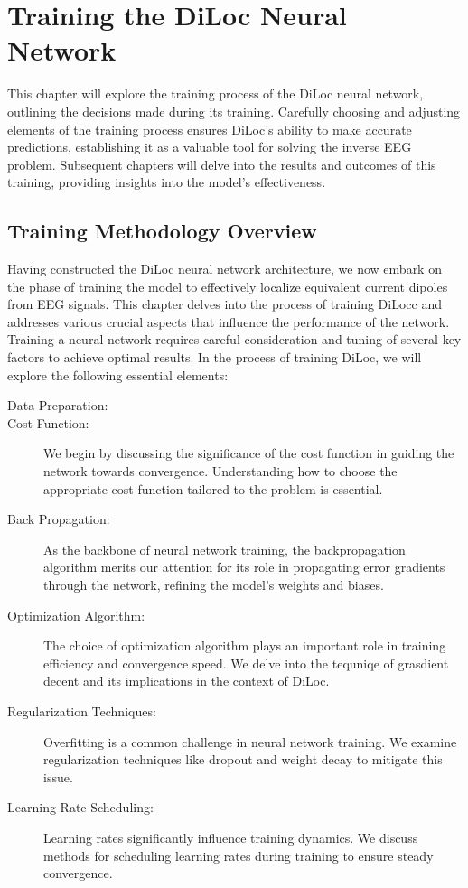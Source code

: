 \documentclass[a4paper, UKenglish, 11pt]{uiomaster}
\begin{document}
\rednote{}
\chapter{Training the DiLoc Neural Network}
This chapter will explore the training process of the DiLoc neural network, outlining the decisions made during its training. Carefully choosing and adjusting elements of the training process ensures DiLoc's ability to make accurate predictions, establishing it as a valuable tool for solving the inverse EEG problem. Subsequent chapters will delve into the results and outcomes of this training, providing insights into the model's effectiveness.

\section{Training Methodology Overview}
Having constructed the DiLoc neural network architecture, we now embark on the phase of training the model to effectively localize equivalent current dipoles from EEG signals. This chapter delves into the process of training DiLocc and addresses various crucial aspects that influence the performance of the network. Training a neural network requires careful consideration and tuning of several key factors to achieve optimal results. In the process of training DiLoc, we will explore the following essential elements:

\begin{description}
   \item [Data Preparation:]

   \item [Cost Function:] We begin by discussing the significance of the cost function in guiding the network towards convergence. Understanding how to choose the appropriate cost function tailored to the problem is essential.

   \item[Back Propagation:] As the backbone of neural network training, the backpropagation algorithm merits our attention for its role in propagating error gradients through the network, refining the model's weights and biases.

   \item[Optimization Algorithm:] The choice of optimization algorithm plays an important role in training efficiency and convergence speed. We delve into the tequniqe of grasdient decent and its implications in the context of DiLoc. 

   \item[Regularization Techniques:] Overfitting is a common challenge in neural network training. We examine regularization techniques like dropout and weight decay to mitigate this issue.

   \item[Learning Rate Scheduling:] Learning rates significantly influence training dynamics. We discuss methods for scheduling learning rates during training to ensure steady convergence.

\end{description}
\end{document}
